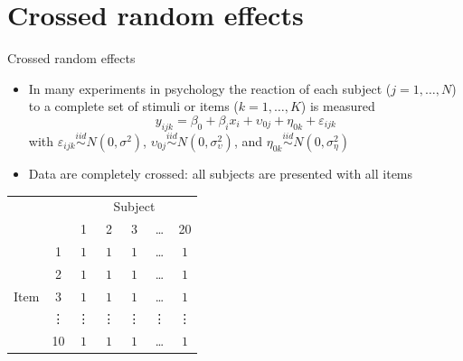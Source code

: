 \documentclass[aspectratio=169]{beamer}
\begin{document}
\section{Crossed random effects}

\begin{frame}{Crossed random effects}
  \begin{itemize}
    \item In many experiments in psychology the reaction of each subject ($j =
      1, \dots, N$) to a complete set of stimuli or items ($k = 1, \dots, K$) is
      measured
  \[
    y_{ijk} = \beta_0 + \beta_ix_{i} + \upsilon_{0j} + \eta_{0k} + \varepsilon_{ijk}
  \]
  with $\varepsilon_{ijk} \overset{iid}{\sim} N(0,\sigma^2)$, 
  $\upsilon_{0j} \overset{iid}{\sim} N(0,\sigma^2_{\upsilon})$, and 
  $\eta_{0k} \overset{iid}{\sim} N(0,\sigma^2_{\eta})$

    \item Data are completely crossed: all subjects are presented with all items
  \end{itemize}
  \footnotesize
  \begin{center}
  \begin{tabular}{lcccccc}
    & & \multicolumn{5}{c}{Subject}\\
    \cline{3-7}
     & & 1 & 2 & 3 & \dots & 20 \\
    \hline
      & 1 & $1$ & $1$ & $1$ & \dots & $1$ \\
      & 2 & $1$ & $1$ & $1$ & \dots & $1$ \\
Item  & 3 & $1$ & $1$ & $1$ & \dots & $1$ \\
      & \vdots & \vdots & \vdots & \vdots & \vdots & \vdots\\
      & 10 & $1$ & $1$ & $1$ & \dots & $1$ \\
      \hline
  \end{tabular}
  \end{center}
\end{frame}
\end{document}
